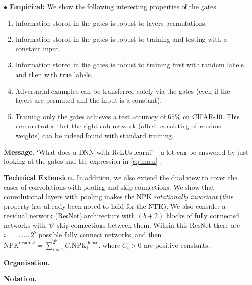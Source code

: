 $\bullet$ \textbf{Empirical:} We show the following interesting properties of the gates.
\begin{enumerate}
\item Information stored in the gates is robust to layers permutations.
\item Information stored in the gates is robust to  training and testing with a constant input. 
\item Information stored in the gates is robust to training first with random labels and then with true labels.
\item Adversarial examples can be transferred solely via the gates (even if the layers are permuted and the input is a constant).
\item Training only the gates achieves a test accuracy of $65\%$ on CIFAR-10. This demonstrates that the right sub-network (albeit consisting of random weights) can be indeed found with standard training.
\end{enumerate}

\textbf{Message.}  `What does a DNN with ReLUs learn?' - a lot can be answered by just looking at the gates and the expression in \eqref{eq:main} .

\textbf{Technical Extension.} In addition, we also extend the dual view to cover the cases of convolutions with pooling and skip connections. We show that convolutional layers with pooling makes the NPK \emph{rotationally invariant} (this property has already been noted to hold for the NTK). We also consider a residual network (ResNet) architecture with $(b+2)$ blocks of fully connected networks with `$b$' skip connections between them. Within this ResNet there are $i=1,\ldots,2^b$ possible fully connect networks, and then $\text{NPK}^{\text{residual}}=\sum_{i=1}^{2^b} C_i \text{NPK}^{\text{dense}}_i$, where $C_i>0$ are positive constants.





\textbf{Organisation.}

\textbf{Notation.}

